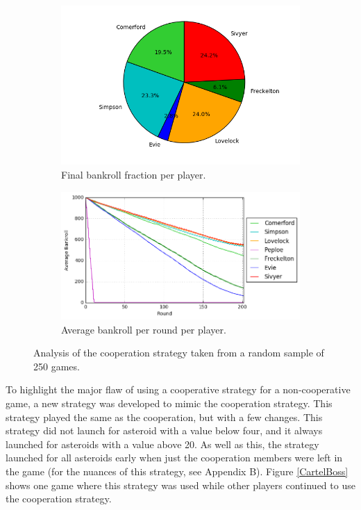 \documentclass[11pt, twoside]{article}
\begin{document}
\begin{figure}[t]
	\centering
	\begin{subfigure}[b]{0.42\textwidth}
		\includegraphics[width=\textwidth]{cartel_analysis4.png}
		\caption{Final bankroll fraction per player.}
	\end{subfigure}
	\begin{subfigure}[b]{0.57\textwidth}
		\includegraphics[width=\textwidth,keepaspectratio]{cartel_analysis1.png}
		\caption{Average bankroll per round per player.}
	\end{subfigure}
	\caption{Analysis of the cooperation strategy taken from a random sample of 250 games.}
	\label{Analysis3}
\end{figure}

To highlight the major flaw of using a cooperative strategy for a non-cooperative game, a new strategy was developed to mimic the cooperation strategy. This strategy played the same as the cooperation, but with a few changes. This strategy did not launch for asteroid with a value below four, and it always launched for asteroids with a value above 20. As well as this, the strategy launched for all asteroids early when just the cooperation members were left in the game (for the nuances of this strategy, see Appendix B). Figure \ref{CartelBoss} shows one game where this strategy was used while other players continued to use the cooperation strategy.
\end{document}
